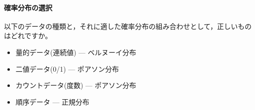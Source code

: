 \documentclass{ltjbook}
\begin{document}
\paragraph{確率分布の選択}
以下のデータの種類と，それに適した確率分布の組み合わせとして，正しいものはどれですか。
\begin{itemize}
	\item 量的データ(連続値) --- ベルヌーイ分布
	\item 二値データ(0/1) --- ポアソン分布
	\item カウントデータ(度数) --- ポアソン分布
	\item 順序データ --- 正規分布
\end{itemize}
\end{document}
